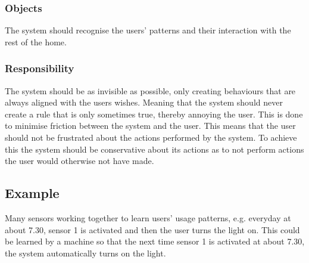 \subsubsection{Objects}

The system should recognise the users' patterns and their interaction with the
rest of the home.

\subsubsection{Responsibility}

The system should be as invisible as possible, only creating behaviours that are always aligned with the users wishes. Meaning that the system should never create a rule that is only sometimes true, thereby annoying the user. This is done to minimise friction between the system and the user. This means that the user should not be frustrated about the actions performed by the system. To achieve this the system should be conservative about its actions as to not perform actions the user would otherwise not have made.

\subsection{Example}

Many sensors working together to learn users’ usage patterns, e.g. everyday at about 7.30, sensor 1 is activated and then the user turns the light on. This could be learned by a machine so that the next time sensor 1 is activated at about 7.30, the system automatically turns on the light.

